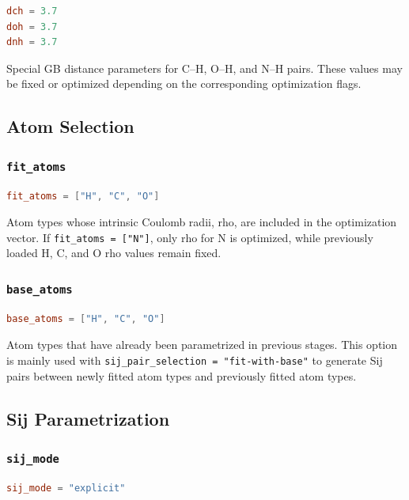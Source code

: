 \documentclass[11pt]{article}
\begin{document}
\begin{lstlisting}[language=toml]
dch = 3.7
doh = 3.7
dnh = 3.7
\end{lstlisting}

Special GB distance parameters for C--H, O--H, and N--H pairs. These values may
be fixed or optimized depending on the corresponding optimization flags.

\subsection{Atom Selection}

\subsubsection{\texttt{fit\_atoms}}

\begin{lstlisting}[language=toml]
fit_atoms = ["H", "C", "O"]
\end{lstlisting}

Atom types whose intrinsic Coulomb radii, rho, are included in the optimization
vector. If \texttt{fit\_atoms = ["N"]}, only rho for N is optimized, while
previously loaded H, C, and O rho values remain fixed.

\subsubsection{\texttt{base\_atoms}}

\begin{lstlisting}[language=toml]
base_atoms = ["H", "C", "O"]
\end{lstlisting}

Atom types that have already been parametrized in previous stages. This option
is mainly used with \texttt{sij\_pair\_selection = "fit-with-base"} to generate
Sij pairs between newly fitted atom types and previously fitted atom types.

\subsection{Sij Parametrization}

\subsubsection{\texttt{sij\_mode}}

\begin{lstlisting}[language=toml]
sij_mode = "explicit"
\end{lstlisting}
\end{document}
